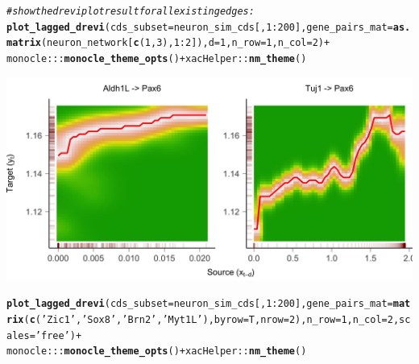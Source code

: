 \documentclass[10pt,oneside]{article}\usepackage[]{graphicx}\usepackage[]{color}
\makeatletter
\def\maxwidth{ %
  \ifdim\Gin@nat@width>\linewidth
    \linewidth
  \else
    \Gin@nat@width
  \fi
}
\newcommand{\hlnum}[1]{\textcolor[rgb]{0.686,0.059,0.569}{#1}}%
\newcommand{\hlstr}[1]{\textcolor[rgb]{0.192,0.494,0.8}{#1}}%
\newcommand{\hlcom}[1]{\textcolor[rgb]{0.678,0.584,0.686}{\textit{#1}}}%
\newcommand{\hlopt}[1]{\textcolor[rgb]{0,0,0}{#1}}%
\newcommand{\hlstd}[1]{\textcolor[rgb]{0.345,0.345,0.345}{#1}}%
\newcommand{\hlkwc}[1]{\textcolor[rgb]{0.333,0.667,0.333}{#1}}%
\newcommand{\hlkwd}[1]{\textcolor[rgb]{0.737,0.353,0.396}{\textbf{#1}}}%
\newenvironment{kframe}{%
 \def\at@end@of@kframe{}%
 \ifinner\ifhmode%
  \def\at@end@of@kframe{\end{minipage}}%
  \begin{minipage}{\columnwidth}%
 \fi\fi%
 \def\FrameCommand##1{\hskip\@totalleftmargin \hskip-\fboxsep
 \colorbox{shadecolor}{##1}\hskip-\fboxsep
     \hskip-\linewidth \hskip-\@totalleftmargin \hskip\columnwidth}%
 \MakeFramed {\advance\hsize-\width
   \@totalleftmargin\z@ \linewidth\hsize
   \@setminipage}}%
 {\par\unskip\endMakeFramed%
 \at@end@of@kframe}
\newenvironment{knitrout}{}{} %
\makeatother
\begin{document}
\begin{knitrout}
\color{fgcolor}\begin{kframe}
\begin{alltt}
\hlcom{# show the drevi plot result for all existing edges:}
\hlkwd{plot_lagged_drevi}\hlstd{(}\hlkwc{cds_subset} \hlstd{= neuron_sim_cds[,} \hlnum{1}\hlopt{:}\hlnum{200}\hlstd{],} \hlkwc{gene_pairs_mat} \hlstd{=} \hlkwd{as.matrix}\hlstd{(neuron_network[}\hlkwd{c}\hlstd{(}\hlnum{1}\hlstd{,} \hlnum{3}\hlstd{),} \hlnum{1}\hlopt{:}\hlnum{2}\hlstd{]),} \hlkwc{d} \hlstd{=} \hlnum{1}\hlstd{,} \hlkwc{n_row} \hlstd{=} \hlnum{1}\hlstd{,} \hlkwc{n_col} \hlstd{=} \hlnum{2}\hlstd{)} \hlopt{+}
  \hlstd{monocle}\hlopt{:::}\hlkwd{monocle_theme_opts}\hlstd{()} \hlopt{+} \hlstd{xacHelper}\hlopt{::}\hlkwd{nm_theme}\hlstd{()}
\end{alltt}
\end{kframe}

{\centering \includegraphics[width=\maxwidth]{figure/plot_drevi-1} 

}


\begin{kframe}\begin{alltt}
\hlkwd{plot_lagged_drevi}\hlstd{(}\hlkwc{cds_subset} \hlstd{= neuron_sim_cds[,} \hlnum{1}\hlopt{:}\hlnum{200}\hlstd{],} \hlkwc{gene_pairs_mat} \hlstd{=} \hlkwd{matrix}\hlstd{(}\hlkwd{c}\hlstd{(}\hlstr{'Zic1'}\hlstd{,} \hlstr{'Sox8'}\hlstd{,} \hlstr{'Brn2'}\hlstd{,} \hlstr{'Myt1L'}\hlstd{),} \hlkwc{byrow} \hlstd{= T,} \hlkwc{nrow} \hlstd{=} \hlnum{2}\hlstd{),} \hlkwc{n_row} \hlstd{=} \hlnum{1}\hlstd{,} \hlkwc{n_col} \hlstd{=} \hlnum{2}\hlstd{,} \hlkwc{scales} \hlstd{=} \hlstr{'free'}\hlstd{)} \hlopt{+}
  \hlstd{monocle}\hlopt{:::}\hlkwd{monocle_theme_opts}\hlstd{()} \hlopt{+} \hlstd{xacHelper}\hlopt{::}\hlkwd{nm_theme}\hlstd{()}
\end{alltt}
\end{kframe}


\end{knitrout}
\end{document}
